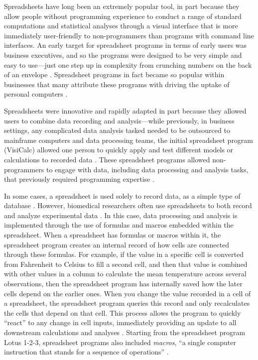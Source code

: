 \documentclass[]{tufte-book}
\begin{document}
Spreadsheets have long been an extremely popular tool, in part because they
allow people without programming experience to conduct a range of standard
computations and statistical analyses through a visual interface that is more
immediately user-friendly to non-programmers than programs with command line
interfaces. An early target for spreadsheet programs in terms of early users was
business executives, and so the programs were designed to be very simple and
easy to use---just one step up in complexity from crunching numbers on the back
of an envelope \citep{campbell2007number}. Spreadsheet programs in fact became so
popular within businesses that many attribute these programs with driving the
uptake of personal computers \citep{campbell2007number}.

Spreadsheets were innovative and rapidly adapted in part because they allowed
users to combine data recording and analysis---while previously, in business
settings, any complicated data analysis tasked needed to be outsourced to
mainframe computers and data processing teams, the initial spreadsheet program
(VisiCalc) allowed one person to quickly apply and test different models or
calculations to recorded data \citep{levy1984spreadsheet}. These spreadsheet programs
allowed non-programmers to engage with data, including data processing and
analysis tasks, that previously required programming expertise
\citep{levy1984spreadsheet}.

In some cases, a spreadsheet is used solely to record data, as a simple type of
database \citep{birch2018future}. However, biomedical researchers often use
spreadsheets to both record and analyze experimental data \citep{anderson2007issues}.
In this case, data processing and analysis is implemented through the use of
formulas and macros embedded within the spreadsheet. When a spreadsheet has
formulas or macros within it, the spreadsheet program creates an internal record
of how cells are connected through these formulas. For example, if the value in
a specific cell is converted from Fahrenheit to Celsius to fill a second cell,
and then that value is combined with other values in a column to calculate the
mean temperature across several observations, then the spreadsheet program has
internally saved how the later cells depend on the earlier ones. When you change
the value recorded in a cell of a spreadsheet, the spreadsheet program queries
this record and only recalculates the cells that depend on that cell. This
process allows the program to quickly ``react'' to any change in cell inputs,
immediately providing an update to all downstream calculations and analyses
\citep{levy1984spreadsheet}. Starting from the spreadsheet program Lotus 1-2-3,
spreadsheet programs also included \emph{macros}, ``a single computer instruction that
stands for a sequence of operations'' \citep{creeth1985microcomputer}.
\end{document}
